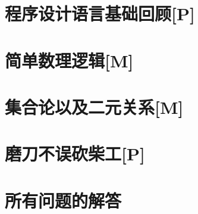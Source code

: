 \chapter{程序设计语言基础回顾[P]}

\chapter{简单数理逻辑[M]}

\chapter{集合论以及二元关系[M]}

\chapter{磨刀不误砍柴工[P]}



\chapter*{所有问题的解答}
    
    \begin{multicols}{2}\raggedcolumns
        \shipoutAnswer
    \end{multicols}




